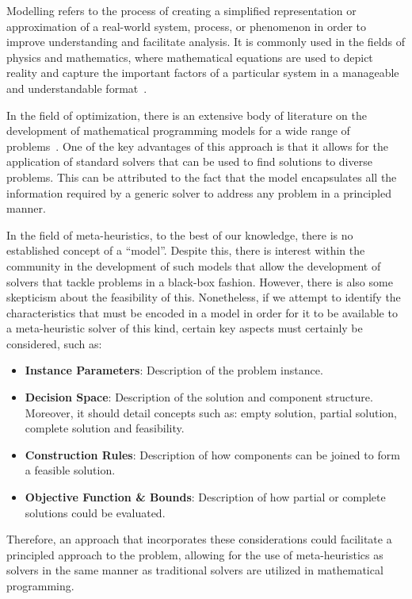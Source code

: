 Modelling refers to the process of creating a simplified representation or
approximation of a real-world system, process, or phenomenon in order to improve
understanding and facilitate analysis. It is commonly used in the fields of
physics and mathematics, where mathematical equations are used to depict reality
and capture the important factors of a particular system in a manageable and
understandable format~\cite{witelski2015methods}.

In the field of optimization, there is an extensive body of literature on the
development of mathematical programming models for a wide range of
problems~\cite{papadimitriou1998combinatorial,nocedal2006numerical,williamson2011design}.
One of the key advantages of this approach is that it
allows for the application of standard solvers that can be used to find
solutions to diverse problems. This can be attributed to the fact that the model
encapsulates all the information required by a generic solver to address any
problem in a principled manner.

In the field of meta-heuristics, to the best of our knowledge, there is no
established concept of a ``model''. Despite this, there is interest within the
community in the development of such models that allow the development of
solvers that tackle problems in a black-box fashion. However, there is also some
skepticism about the feasibility of this. Nonetheless, if we attempt to identify
the characteristics that must be encoded in a model in order for it to be
available to a meta-heuristic solver of this kind, certain key aspects must
certainly be considered, such as:

\begin{itemize}
      \item \textbf{Instance Parameters}: Description of the problem instance.
      \item \textbf{Decision Space}: Description of the solution and component
            structure. Moreover, it should detail concepts such as: empty
            solution, partial solution, complete solution and feasibility.
      \item \textbf{Construction Rules}: Description of how components can be
            joined to form a feasible solution.
      \item \textbf{Objective Function \& Bounds}: Description of how partial or
            complete solutions could be evaluated.
\end{itemize}

Therefore, an approach that incorporates these considerations could facilitate a
principled approach to the problem, allowing for the use of meta-heuristics as
solvers in the same manner as traditional solvers are utilized in mathematical
programming.

